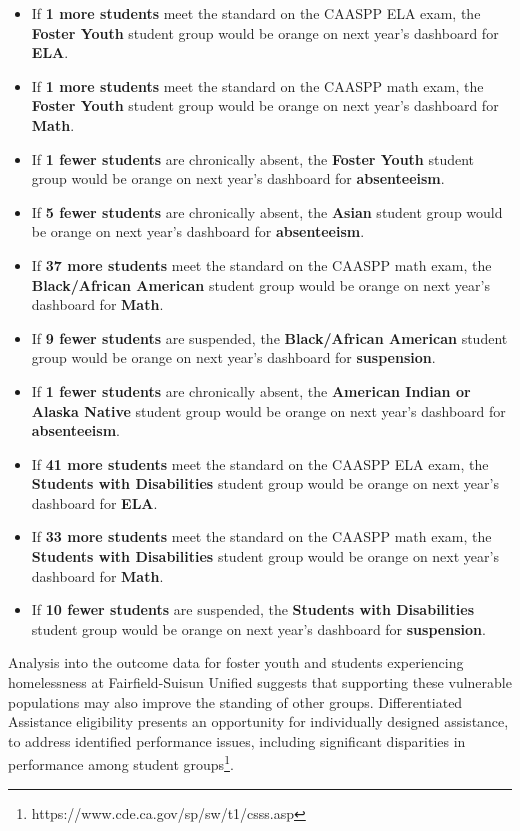 \documentclass[
  10pt,
  letterpaper,
  DIV=11,
  numbers=noendperiod]{scrartcl}
\begin{document}
\begin{itemize}
\item
  If \textbf{1 more students} meet the standard on the CAASPP ELA exam,
  the \textbf{Foster Youth} student group would be orange on next year's
  dashboard for \textbf{ELA}.
\item
  If \textbf{1 more students} meet the standard on the CAASPP math exam,
  the \textbf{Foster Youth} student group would be orange on next year's
  dashboard for \textbf{Math}.
\item
  If \textbf{1 fewer students} are chronically absent, the
  \textbf{Foster Youth} student group would be orange on next year's
  dashboard for \textbf{absenteeism}.
\item
  If \textbf{5 fewer students} are chronically absent, the
  \textbf{Asian} student group would be orange on next year's dashboard
  for \textbf{absenteeism}.
\item
  If \textbf{37 more students} meet the standard on the CAASPP math
  exam, the \textbf{Black/African American} student group would be
  orange on next year's dashboard for \textbf{Math}.
\item
  If \textbf{9 fewer students} are suspended, the \textbf{Black/African
  American} student group would be orange on next year's dashboard for
  \textbf{suspension}.
\item
  If \textbf{1 fewer students} are chronically absent, the
  \textbf{American Indian or Alaska Native} student group would be
  orange on next year's dashboard for \textbf{absenteeism}.
\item
  If \textbf{41 more students} meet the standard on the CAASPP ELA exam,
  the \textbf{Students with Disabilities} student group would be orange
  on next year's dashboard for \textbf{ELA}.
\item
  If \textbf{33 more students} meet the standard on the CAASPP math
  exam, the \textbf{Students with Disabilities} student group would be
  orange on next year's dashboard for \textbf{Math}.
\item
  If \textbf{10 fewer students} are suspended, the \textbf{Students with
  Disabilities} student group would be orange on next year's dashboard
  for \textbf{suspension}.
\end{itemize}

Analysis into the outcome data for foster youth and students
experiencing homelessness at Fairfield-Suisun Unified suggests that
supporting these vulnerable populations may also improve the standing of
other groups. Differentiated Assistance eligibility presents an
opportunity for individually designed assistance, to address identified
performance issues, including significant disparities in performance
among student groups\footnote{https://www.cde.ca.gov/sp/sw/t1/csss.asp}.
\end{document}
